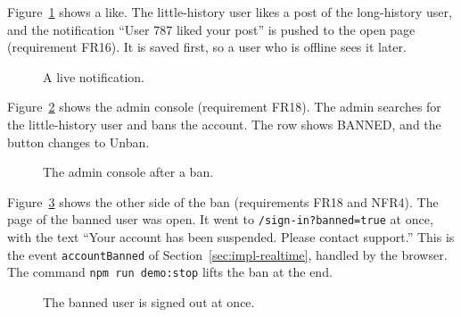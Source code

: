 Figure~\ref{fig:demo-notification} shows a like. The little-history user likes a post of the long-history user, and the notification ``User 787 liked your post'' is pushed to the open page (requirement FR16). It is saved first, so a user who is offline sees it later.

\begin{figure}[htbp]
  \centering
  \caption{A live notification.}
  \label{fig:demo-notification}
\end{figure}

Figure~\ref{fig:demo-admin} shows the admin console (requirement FR18). The admin searches for the little-history user and bans the account. The row shows BANNED, and the button changes to Unban.

\begin{figure}[htbp]
  \centering
  \caption{The admin console after a ban.}
  \label{fig:demo-admin}
\end{figure}

Figure~\ref{fig:demo-banned} shows the other side of the ban (requirements FR18 and NFR4). The page of the banned user was open. It went to \texttt{/sign-in?banned=true} at once, with the text ``Your account has been suspended. Please contact support.'' This is the event \texttt{accountBanned} of Section~\ref{sec:impl-realtime}, handled by the browser. The command \texttt{npm run demo:stop} lifts the ban at the end.

\begin{figure}[htbp]
  \centering
  \caption{The banned user is signed out at once.}
  \label{fig:demo-banned}
\end{figure}
\setlength{\emergencystretch}{0pt}
\renewcommand{\topfraction}{0.7}
\renewcommand{\bottomfraction}{0.3}
\renewcommand{\textfraction}{0.2}
\renewcommand{\floatpagefraction}{0.5}
